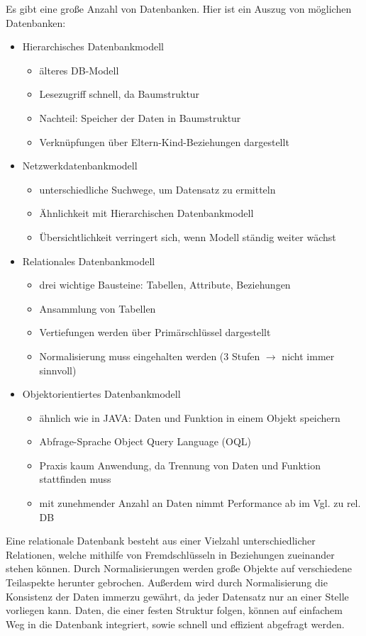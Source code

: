 Es gibt eine große Anzahl von Datenbanken. Hier ist ein Auszug von möglichen Datenbanken:\autocite{online_Datenbank}
\begin{itemize}
	\item Hierarchisches Datenbankmodell
	\begin{itemize}
		\item älteres DB-Modell
		\item Lesezugriff schnell, da Baumstruktur
		\item Nachteil: Speicher der Daten in Baumstruktur
		\item Verknüpfungen über Eltern-Kind-Beziehungen dargestellt
	\end{itemize}
	\item Netzwerkdatenbankmodell
	\begin{itemize}
		\item unterschiedliche Suchwege, um Datensatz zu ermitteln
		\item Ähnlichkeit mit Hierarchischen Datenbankmodell
		\item Übersichtlichkeit verringert sich, wenn Modell ständig weiter wächst
	\end{itemize}
	\item Relationales Datenbankmodell
	\begin{itemize}
		\item drei wichtige Bausteine: Tabellen, Attribute, Beziehungen
		\item Ansammlung von Tabellen
		\item Vertiefungen werden über Primärschlüssel dargestellt
		\item Normalisierung muss eingehalten werden (3 Stufen $\rightarrow$ nicht immer sinnvoll)
	\end{itemize}
	\item Objektorientiertes Datenbankmodell
	\begin{itemize}
		\item ähnlich wie in JAVA: Daten und Funktion in einem Objekt speichern
		\item Abfrage-Sprache Object Query Language (OQL) 
		\item Praxis kaum Anwendung, da Trennung von Daten und Funktion stattfinden muss
		\item  mit zunehmender Anzahl an Daten nimmt Performance ab im Vgl. zu rel. DB
	\end{itemize}
\end{itemize}

Eine relationale Datenbank besteht aus einer Vielzahl unterschiedlicher Relationen, welche mithilfe von Fremdschlüsseln in Beziehungen zueinander stehen können.
Durch Normalisierungen werden große Objekte auf verschiedene Teilaspekte herunter gebrochen. 
Außerdem wird durch Normalisierung die Konsistenz der Daten immerzu gewährt, da jeder Datensatz nur an einer Stelle vorliegen kann. Daten, die einer festen Struktur folgen, können auf einfachem Weg in die Datenbank integriert, sowie schnell
und effizient abgefragt werden.

